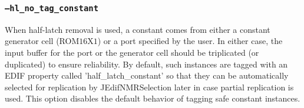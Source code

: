 \subsubsection{\texttt{--hl\_no\_tag\_constant}}
When half-latch removal is used, a constant comes from either a constant
generator cell (ROM$16$X$1$) or a port specified by the user. In either case,
the input buffer for the port or the generator cell should be triplicated (or
duplicated) to ensure reliability. By default, such instances are tagged with
an EDIF property called 'half\_latch\_constant' so that they can be
automatically selected for replication by JEdifNMRSelection later in case
partial replication is used. This option disables the default behavior of
tagging safe constant instances.





%
%



